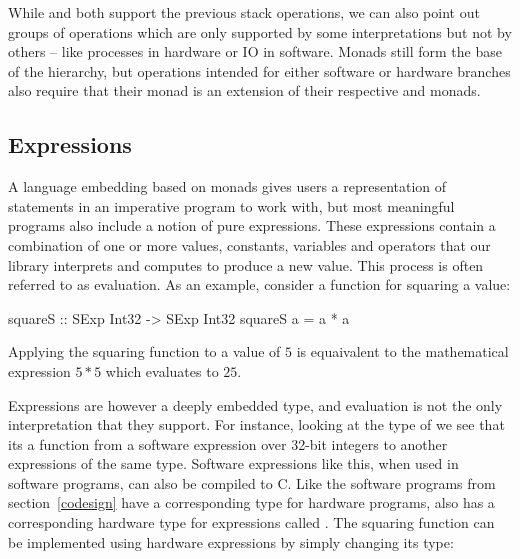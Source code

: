 While  and  both support the previous stack operations, we can also point out groups of operations which are only supported by some interpretations but not by others -- like processes in hardware or IO in software. Monads still form the base of the hierarchy, but operations intended for either software or hardware branches also require that their monad is an extension of their respective  and  monads.


\subsection{Expressions}
\label{expr}

A language embedding based on monads gives users a representation of statements in an imperative program to work with, but most meaningful programs also include a notion of pure expressions. These expressions contain a combination of one or more values, constants, variables and operators that our library interprets and computes to produce a new value. This process is often referred to as evaluation. As an example, consider a function for squaring a value:

\begin{code}
squareS :: SExp Int32 -> SExp Int32
squareS a = a * a
\end{code}

\noindent Applying the squaring function to a value of $5$ is equaivalent to the mathematical expression $5*5$ which evaluates to $25$.

Expressions are however a deeply embedded type, and evaluation is not the only interpretation that they support. For instance, looking at the type of  we see that its a function from a software expression over 32-bit integers to another expressions of the same type. Software expressions like this, when used in software programs, can also be compiled to C. Like the software programs from section~\ref{codesign} have a corresponding type for hardware programs,  also has a corresponding hardware type for expressions called . The squaring function can be implemented using hardware expressions by simply changing its type:

